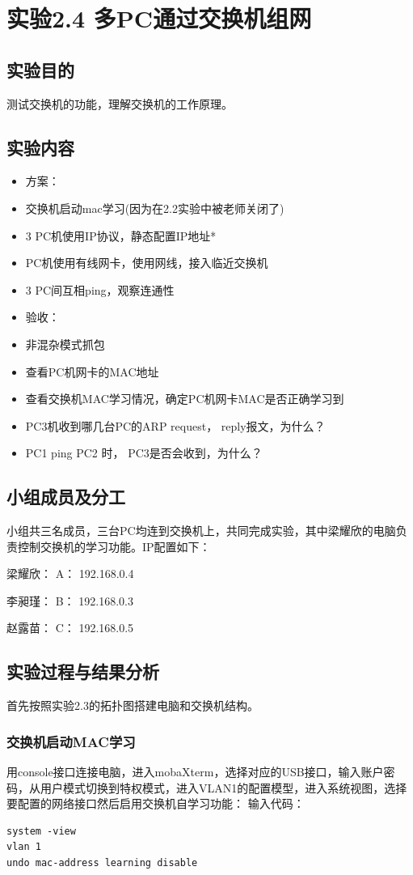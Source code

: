 \documentclass{article}
\begin{document}
\newpage\section{实验2.4 多PC通过交换机组网}
\subsection{实验目的}
测试交换机的功能，理解交换机的工作原理。
\subsection{实验内容}
\begin{itemize}
    \item 方案：
    \item 交换机启动mac学习(因为在2.2实验中被老师关闭了)
    \item 3 PC机使用IP协议，静态配置IP地址*
    \item PC机使用有线网卡，使用网线，接入临近交换机
    \item 3 PC间互相ping，观察连通性
    \item 验收：
    \item 非混杂模式抓包
    \item 查看PC机网卡的MAC地址
    \item 查看交换机MAC学习情况，确定PC机网卡MAC是否正确学习到
    \item PC3机收到哪几台PC的ARP request， reply报文，为什么？
    \item PC1 ping PC2 时， PC3是否会收到，为什么？
\end{itemize}
\subsection{小组成员及分工}
小组共三名成员，三台PC均连到交换机上，共同完成实验，其中梁耀欣的电脑负责控制交换机的学习功能。IP配置如下：

梁耀欣： A： 192.168.0.4

李昶瑾： B： 192.168.0.3

赵露苗： C： 192.168.0.5

\subsection{实验过程与结果分析}
首先按照实验2.3的拓扑图搭建电脑和交换机结构。
\subsubsection{交换机启动MAC学习}
用console接口连接电脑，进入mobaXterm，选择对应的USB接口，输入账户密码，从用户模式切换到特权模式，进入VLAN1的配置模型，进入系统视图，选择要配置的网络接口然后启用交换机自学习功能：
输入代码：
\begin{lstlisting}
system -view
vlan 1
undo mac-address learning disable
\end{lstlisting}
\end{document}

